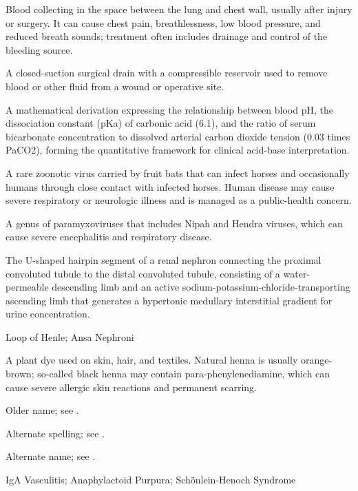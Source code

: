  Blood collecting in the space between the lung and chest wall, usually after injury or surgery. It can cause chest pain, breathlessness, low blood pressure, and reduced breath sounds; treatment often includes drainage and control of the bleeding source.

 A closed-suction surgical drain with a compressible reservoir used to remove blood or other fluid from a wound or operative site.

 A mathematical derivation expressing the relationship between blood pH, the dissociation constant (pKa) of carbonic acid (6.1), and the ratio of serum bicarbonate concentration to dissolved arterial carbon dioxide tension (0.03 times PaCO2), forming the quantitative framework for clinical acid-base interpretation.

 A rare zoonotic virus carried by fruit bats that can infect horses and occasionally humans through close contact with infected horses. Human disease may cause severe respiratory or neurologic illness and is managed as a public-health concern.

 A genus of paramyxoviruses that includes Nipah and Hendra viruses, which can cause severe encephalitis and respiratory disease.

 The U-shaped hairpin segment of a renal nephron connecting the proximal convoluted tubule to the distal convoluted tubule, consisting of a water-permeable descending limb and an active sodium-potassium-chloride-transporting ascending limb that generates a hypertonic medullary interstitial gradient for urine concentration.

\synonyms
Loop of Henle; Ansa Nephroni

 A plant dye used on skin, hair, and textiles. Natural henna is usually orange-brown; so-called black henna may contain para-phenylenediamine, which can cause severe allergic skin reactions and permanent scarring.

 Older name; see .

 Alternate spelling; see .

 Alternate name; see .

\synonyms
IgA Vasculitis; Anaphylactoid Purpura; Schönlein-Henoch Syndrome

